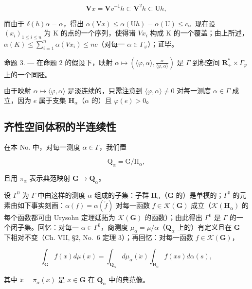 \[
\mathbf {V} x = \mathbf {V} v ^ {- 1} h \subset \mathbf {V} ^ {2} h \subset \mathrm{U} h,
\]

而由于 \(\delta(h)\alpha = \alpha\)，得出 \(\alpha(\mathrm{V}x) \leqslant \alpha(\mathrm{U}h) = \alpha(\mathrm{U}) \leqslant c\)。现在设 \((x_i)_{1 \leqslant i \leqslant n}\) 为 K 的点的一个序列，使得诸 \(Vx_i\) 构成 K 的一个覆盖；由上所述，\(\alpha(K) \leqslant \sum_{i=1}^{n} \alpha(Vx_i) \leqslant nc\)（对每一 \(\alpha \in \Gamma_\varphi\)）；证毕。

命题 3. --- 在命题 2 的假设下，映射 \(\alpha \mapsto \left( \langle \varphi, \alpha \rangle, \frac{\alpha}{\langle \varphi, \alpha \rangle} \right)\) 是 \(\Gamma\) 到积空间 \(\mathbf{R}_{+}^{*} \times \Gamma_{\varphi}\) 上的一个同胚。

由于映射 \(\alpha \mapsto \langle \varphi, \alpha \rangle\) 是淡连续的，只需注意到 \(\langle \varphi, \alpha \rangle \neq 0\) 对每一测度 \(\alpha \in \Gamma\) 成立，因为 \(e\) 属于支集 \(\mathbf{H}_{\alpha}\)（\(\alpha\) 的）且 \(\varphi(e) > 0\)。

\subsection{齐性空间体积的半连续性}

在本 No. 中，对每一测度 \(\alpha \in \Gamma\)，我们置

\[
\mathrm{Q} _ {\alpha} = \mathrm{G} / \mathrm{H} _ {\alpha},\tag{1}
\]

且用 \(\pi_{\alpha}\) 表示典范映射 \(\mathbf{G} \to \mathbf{Q}_{\alpha}\)。

设 \(\Gamma^0\) 为 \(\Gamma\) 中由这样的测度 \(\alpha\) 组成的子集：子群 \(\mathbf{H}_{\alpha}\)（\(\mathbf{G}\) 的）是单模的；\(\Gamma^0\) 的元素由如下事实刻画：\(\alpha(f) = \alpha(\check{f})\) 对每一函数 \(f \in \mathcal{K}(\mathbf{G})\) 成立（\(\mathcal{K}(\mathbf{H}_{\alpha})\) 的每个函数都可由 Urysohn 定理延拓为 \(\mathcal{K}(\mathbf{G})\) 的函数）；由此得出 \(\Gamma^0\) 是 \(\Gamma\) 的一个闭子集。回忆：对每一 \(\alpha \in \Gamma^0\)，商测度 \(\mu_{\alpha} = \mu / \alpha\)（\(\mathbf{Q}_{\alpha}\) 上的）有定义且在 \(\mathbf{G}\) 下相对不变（Ch. VII, §2, No.~6 定理 3）；再回忆：对每一函数 \(f \in \mathcal{K}(\mathbf{G})\)，

\[
\int_ {\mathbf {G}} f (x) d \mu (x) = \int_ {\mathbf {Q} _ {\alpha}} d \mu_ {\alpha} (\dot {x}) \int_ {\mathrm{H} _ {\alpha}} f (x s) d \alpha (s),\tag{2}
\]

其中 \(\dot{x} = \pi_{\alpha}(x)\) 是 \(x\in \mathbf{G}\) 在 \(\mathbf{Q}_{\alpha}\) 中的典范像。

